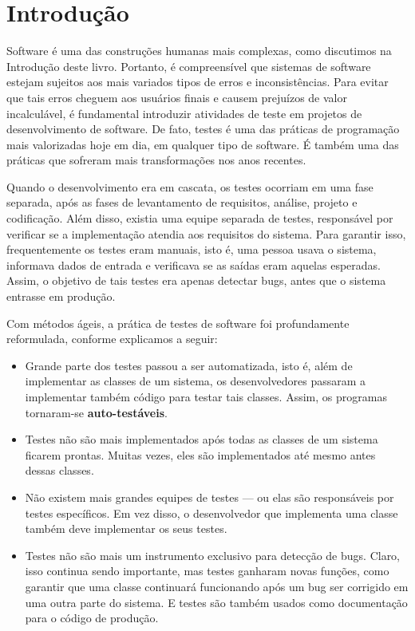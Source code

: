 \documentclass[
  11pt,
  twoside]{book}
\begin{document}
\hypertarget{introduuxe7uxe3o-5}{%
\section{Introdução}\label{introduuxe7uxe3o-5}}


Software é uma das construções humanas mais complexas, como discutimos
na Introdução deste livro. Portanto, é compreensível que sistemas de
software estejam sujeitos aos mais variados tipos de erros e
inconsistências. Para evitar que tais erros cheguem aos usuários finais
e causem prejuízos de valor incalculável, é fundamental introduzir
atividades de teste em projetos de desenvolvimento de software. De fato,
testes é uma das práticas de programação mais valorizadas hoje em dia,
em qualquer tipo de software. É também uma das práticas que sofreram
mais transformações nos anos recentes.

Quando o desenvolvimento era em cascata, os testes ocorriam em uma fase
separada, após as fases de levantamento de requisitos, análise, projeto
e codificação. Além disso, existia uma equipe separada de testes,
responsável por verificar se a implementação atendia aos requisitos do
sistema. Para garantir isso, frequentemente os testes eram manuais, isto
é, uma pessoa usava o sistema, informava dados de entrada e verificava
se as saídas eram aquelas esperadas. Assim, o objetivo de tais testes
era apenas detectar bugs, antes que o sistema entrasse em produção.

Com métodos ágeis, a prática de testes de software foi profundamente
reformulada, conforme explicamos a seguir:

\begin{itemize}
\item
  Grande parte dos testes passou a ser automatizada, isto é, além de
  implementar as classes de um sistema, os desenvolvedores passaram a
  implementar também código para testar tais classes. Assim, os
  programas tornaram-se \textbf{auto-testáveis}.
\item
  Testes não são mais implementados após todas as classes de um sistema
  ficarem prontas. Muitas vezes, eles são implementados até mesmo antes
  dessas classes.
\item
  Não existem mais grandes equipes de testes --- ou elas são
  responsáveis por testes específicos. Em vez disso, o desenvolvedor que
  implementa uma classe também deve implementar os seus testes.
\item
  Testes não são mais um instrumento exclusivo para detecção de bugs.
  Claro, isso continua sendo importante, mas testes ganharam novas
  funções, como garantir que uma classe continuará funcionando após um
  bug ser corrigido em uma outra parte do sistema. E testes são também
  usados como documentação para o código de produção.
\end{itemize}
\end{document}
